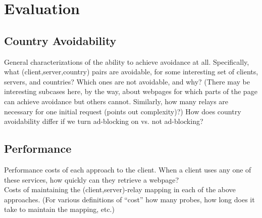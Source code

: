 \section{Evaluation}
\label{evaluation}

\subsection{Country Avoidability}
General characterizations of the ability to achieve avoidance at all. Specifically, what (client,server,country) pairs are avoidable, for some interesting set of clients, servers, and countries? Which ones are not avoidable, and why?  (There may be interesting subcases here, by the way, about webpages for which parts of the page can achieve avoidance but others cannot.  Similarly, how many relays are necessary for one initial request (points out complexity)?)  How does country avoidability differ if we turn ad-blocking on vs. not ad-blocking?

\subsection{Performance}
Performance costs of each approach to the client. When a client uses any one of these services, how quickly can they retrieve a webpage?
\\
Costs of maintaining the (client,server)-relay mapping in each of the above approaches. (For various definitions of ``cost'' how many probes, how long does it take to maintain the mapping, etc.)
